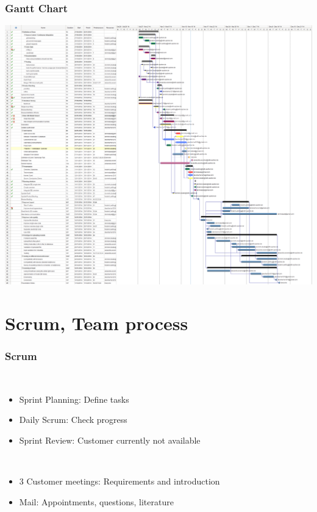 \begin{frame}
  \frametitle{Gantt Chart}
  \includegraphics[width=1.2\textwidth, height=0.7\textwidth]{images/gantt_chart.png}\\
\end{frame}

\section{Scrum, Team process}

\begin{frame}
  \frametitle{Scrum}
  \begin{description}[]
    \item[Scrum Meetings] \hfill \\
    \begin{itemize}
      \item Sprint Planning: Define tasks
      \item Daily Scrum: Check progress
      \item Sprint Review: Customer currently not available
    \end{itemize}
  \end{description}
  \begin{description}[]
    \item[Customer contact] \hfill \\
    \begin{itemize}
      \item 3 Customer meetings: Requirements and introduction
      \item Mail: Appointments, questions, literature
    \end{itemize}
  \end{description}
\end{frame}

